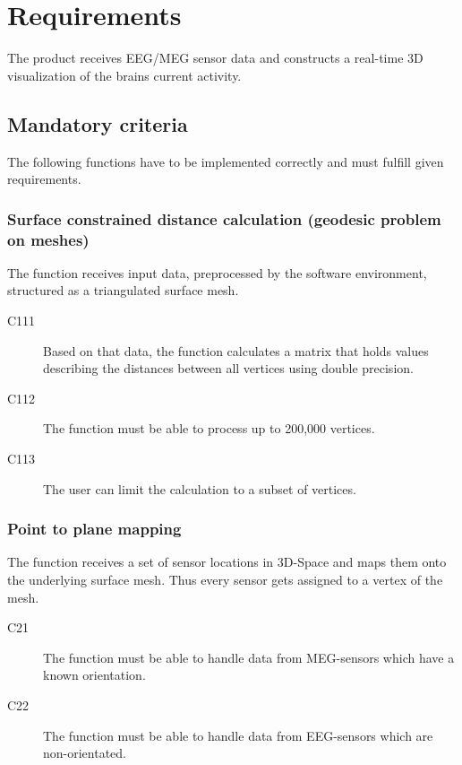 \section{Requirements}
The product receives EEG/MEG sensor data and constructs a real-time 3D visualization of the brains current activity.

\subsection{Mandatory criteria}
The following functions have to be implemented correctly and must fulfill given requirements.
\subsubsection{Surface constrained distance calculation (geodesic problem on meshes)}
The function receives input data, preprocessed by the software environment, structured as a triangulated surface mesh.%


\begin{description}
	\item[C111] Based on that data, the function calculates a matrix that holds values describing the distances between all vertices using double precision. 
	\item[C112] The function must be able to process up to 200,000 vertices.
	\item[C113] The user can limit the calculation to a subset of vertices.
\end{description}

\subsubsection{Point to plane mapping}


The function receives a set of sensor locations in 3D-Space and maps them onto the underlying surface mesh. Thus every sensor gets assigned to a vertex of the mesh. 


\begin{description}
	\item[C21] The function must be able to handle data from MEG-sensors which have a known orientation.
	
	\item[C22] The function must be able to handle data from EEG-sensors which are non-orientated.
\end{description}

